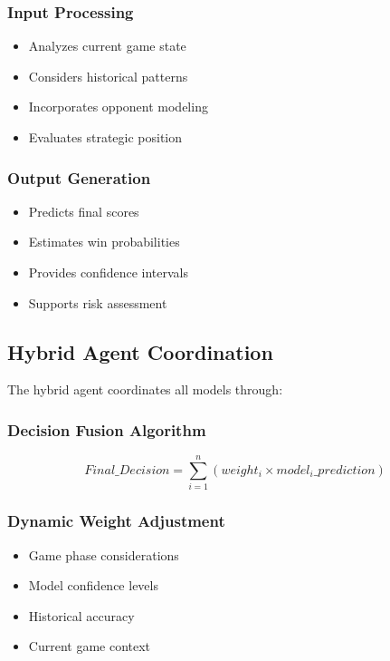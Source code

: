 \documentclass[conference]{IEEEtran}
\begin{document}
\subsubsection{Input Processing}
\begin{itemize}
    \item Analyzes current game state
    \item Considers historical patterns
    \item Incorporates opponent modeling
    \item Evaluates strategic position
\end{itemize}

\subsubsection{Output Generation}
\begin{itemize}
    \item Predicts final scores
    \item Estimates win probabilities
    \item Provides confidence intervals
    \item Supports risk assessment
\end{itemize}

\subsection{Hybrid Agent Coordination}

The hybrid agent coordinates all models through:

\subsubsection{Decision Fusion Algorithm}
\begin{equation}
Final\_Decision = \sum_{i=1}^{n} (weight_i \times model_i\_prediction)
\end{equation}

\subsubsection{Dynamic Weight Adjustment}
\begin{itemize}
    \item Game phase considerations
    \item Model confidence levels
    \item Historical accuracy
    \item Current game context
\end{itemize}
\end{document}
